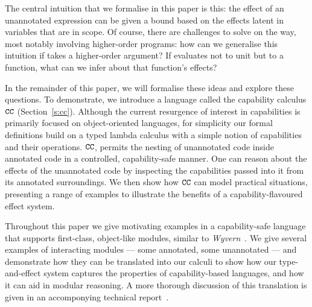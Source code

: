 The central intuition that we formalise in this paper is this: the
effect of an unannotated expression can be given a bound based on the
effects latent in variables that are in scope.  Of course, there are
challenges to solve on the way, most notably involving higher-order
programs: how can we generalise this intuition if  takes a
higher-order argument?  If  evaluates not to unit but to a
function, what can we infer about that function's effects?

In the remainder of this paper, we will formalise these ideas and
explore these questions.  To demonstrate, we introduce a language
called the capability calculus $\mathtt{CC}$ (Section~\ref{s:cc}).
Although the current resurgence of interest in capabilities is
primarily focused on object-oriented languages, for simplicity our
formal definitions build on a typed lambda calculus with a simple
notion of capabilities and their operations. $\mathtt{CC}$, permits the
nesting of unannotated code inside annotated code in a controlled,
capability-safe manner. One can reason about the effects of the
unannotated code by inspecting the capabilities passed into it from
its annotated surroundings.  We then show how $\mathtt{CC}$ can model
practical situations, presenting a range of examples to illustrate the
benefits of a capability-flavoured effect system.


Throughout this paper we give motivating examples in a capability-safe
language %
that supports first-class, object-like modules, similar to
\textit{Wyvern}~\cite{kurilova16}. We give several examples of
interacting modules --- some annotated, some unannotated --- and
demonstrate how they can be translated into our calculi to show how
our type-and-effect system captures the properties of capability-based
languages, and how it can aid in modular reasoning. A more thorough
discussion of this translation is given in an accomponying technical
report~\cite{ecs:2018:aaron-tr}.
